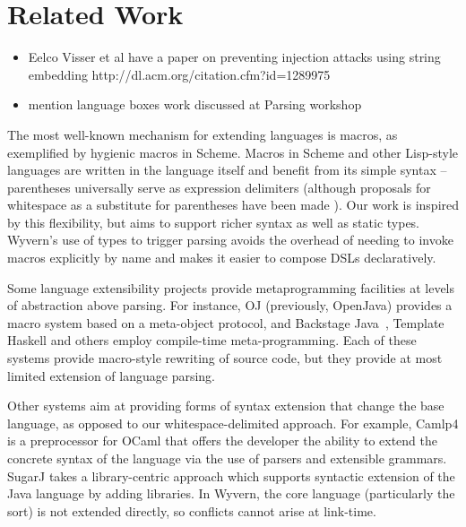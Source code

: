 \section{Related Work}
\label{s:related}

\begin{itemize}
\item Eelco Visser et al have a paper on preventing injection attacks using string embedding http://dl.acm.org/citation.cfm?id=1289975
\item mention language boxes work discussed at Parsing workshop
\end{itemize}

The most well-known mechanism for extending languages is macros, as exemplified by hygienic macros in Scheme. Macros in Scheme and other Lisp-style languages are written in the language itself and benefit from its simple syntax -- parentheses universally serve as expression delimiters (although proposals for whitespace as a substitute for parentheses have been made \cite{srfi-49}). Our work is inspired by this flexibility, but aims to support richer syntax as well as static types. Wyvern's use of types to trigger parsing  avoids the overhead of needing to invoke macros explicitly by name and makes it easier to compose DSLs declaratively.


Some language extensibility projects provide metaprogramming facilities at levels of abstraction above parsing. For instance, OJ (previously, OpenJava)
\cite{Tatsubori00openjava:a} provides a macro system based on a meta-object
protocol, and Backstage Java~\cite{Palmer:2011:BJM:2048066.2048137}, Template Haskell \cite{sheard2002template} and others employ compile-time meta-programming.  Each of these systems provide macro-style rewriting of source code, but they provide at most limited extension of language parsing.

Other systems aim at providing forms of syntax extension that change the base language, as opposed to our whitespace-delimited approach.  For example, Camlp4 \cite{camlp4} is a preprocessor for OCaml that offers the developer the ability to extend the concrete syntax of the language via the use of parsers and extensible grammars.  SugarJ \cite{Erdweg:2011:SLL:2048147.2048199} takes a library-centric approach which supports syntactic extension of the Java language by adding libraries. In Wyvern, the core language (particularly the  sort) is not extended directly, so conflicts cannot arise at link-time. 

